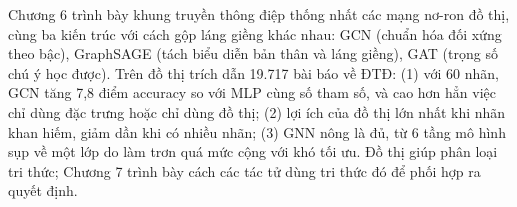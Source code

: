 Chương 6 trình bày khung truyền thông điệp thống nhất các mạng nơ-ron đồ thị, cùng ba kiến trúc với cách gộp láng giềng khác nhau: GCN (chuẩn hóa đối xứng theo bậc), GraphSAGE (tách biểu diễn bản thân và láng giềng), GAT (trọng số chú ý học được). Trên đồ thị trích dẫn 19.717 bài báo về ĐTĐ: (1) với 60 nhãn, GCN tăng 7,8 điểm accuracy so với MLP cùng số tham số, và cao hơn hẳn việc chỉ dùng đặc trưng hoặc chỉ dùng đồ thị; (2) lợi ích của đồ thị lớn nhất khi nhãn khan hiếm, giảm dần khi có nhiều nhãn; (3) GNN nông là đủ, từ 6 tầng mô hình sụp về một lớp do làm trơn quá mức cộng với khó tối ưu. Đồ thị giúp phân loại tri thức; Chương 7 trình bày cách các tác tử dùng tri thức đó để phối hợp ra quyết định.

